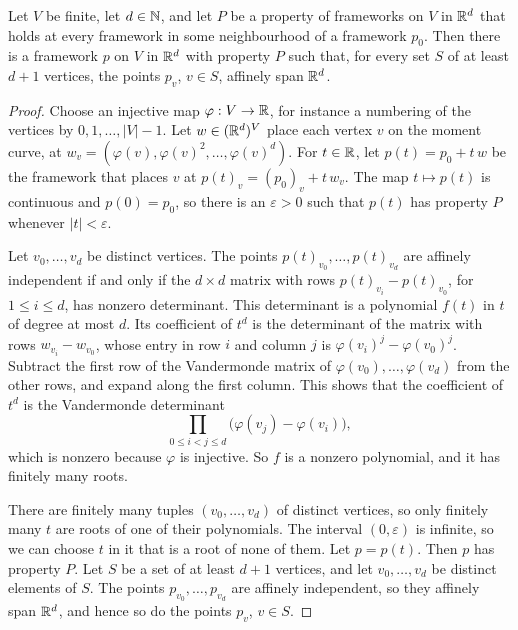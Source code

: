 \begin{lemma}
  \label{lem:exists-affinelySpanning-of-eventually}
  \leanok
  Let $V$ be finite, let $d \in {\mathbb{N}}$, and let $P$ be a property of
  frameworks on $V$ in ${\mathbb{R}}^{d}$ that holds at every framework in some
  neighbourhood of a framework $p_0$. Then there is a framework $p$ on
  $V$ in ${\mathbb{R}}^{d}$ with property $P$ such that, for every set $S$ of at
  least $d + 1$ vertices, the points $p_v$, $v \in S$, affinely span
  ${\mathbb{R}}^{d}$.
\end{lemma}
\begin{proof}
  \leanok
  Choose an injective map $\varphi : V \to {\mathbb{R}}$, for instance a
  numbering of the vertices by $0, 1, \dots, |V| - 1$. Let
  $w \in ({\mathbb{R}}^{d})^{V}$ place each vertex $v$ on the moment curve, at
  $w_v = (\varphi(v), \varphi(v)^{2}, \dots, \varphi(v)^{d})$. For
  $t \in {\mathbb{R}}$, let $p(t) = p_0 + t\,w$ be the framework that places $v$
  at $p(t)_v = (p_0)_v + t\,w_v$. The map $t \mapsto p(t)$ is continuous
  and $p(0) = p_0$, so there is an $\varepsilon > 0$ such that $p(t)$
  has property $P$ whenever $|t| < \varepsilon$.

  Let $v_0, \dots, v_d$ be distinct vertices. The points
  $p(t)_{v_0}, \dots, p(t)_{v_d}$ are affinely independent if and only
  if the $d \times d$ matrix with rows $p(t)_{v_i} - p(t)_{v_0}$, for
  $1 \le i \le d$, has nonzero determinant. This determinant is a
  polynomial $f(t)$ in $t$ of degree at most $d$. Its coefficient of
  $t^{d}$ is the determinant of the matrix with rows
  $w_{v_i} - w_{v_0}$, whose entry in row $i$ and column $j$ is
  $\varphi(v_i)^{j} - \varphi(v_0)^{j}$. Subtract the first row of the
  Vandermonde matrix of $\varphi(v_0), \dots, \varphi(v_d)$ from the
  other rows, and expand along the first column. This shows that the
  coefficient of $t^{d}$ is the Vandermonde determinant
  \[
    \prod_{0 \le i < j \le d} \bigl(\varphi(v_j) - \varphi(v_i)\bigr),
  \]
  which is nonzero because $\varphi$ is injective. So $f$ is a nonzero
  polynomial, and it has finitely many roots.

  There are finitely many tuples $(v_0, \dots, v_d)$ of distinct
  vertices, so only finitely many $t$ are roots of one of their
  polynomials. The interval $(0, \varepsilon)$ is infinite, so we can
  choose $t$ in it that is a root of none of them. Let $p = p(t)$. Then
  $p$ has property $P$. Let $S$ be a set of at least $d + 1$ vertices,
  and let $v_0, \dots, v_d$ be distinct elements of $S$. The points
  $p_{v_0}, \dots, p_{v_d}$ are affinely independent, so they affinely
  span ${\mathbb{R}}^{d}$, and hence so do the points $p_v$, $v \in S$.
\end{proof}


